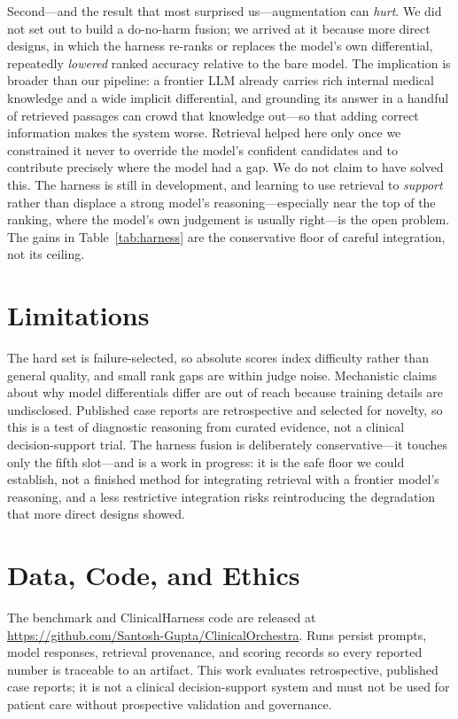 \documentclass{article}
\begin{document}
Second---and the result that most surprised us---augmentation can \emph{hurt}. We did not set out to build a
do-no-harm fusion; we arrived at it because more direct designs, in which the harness re-ranks or replaces
the model's own differential, repeatedly \emph{lowered} ranked accuracy relative to the bare model. The
implication is broader than our pipeline: a frontier LLM already carries rich internal medical knowledge and
a wide implicit differential, and grounding its answer in a handful of retrieved passages can crowd that
knowledge out---so that adding correct information makes the system worse. Retrieval helped here only once we
constrained it never to override the model's confident candidates and to contribute precisely where the model
had a gap. We do not claim to have solved this. The harness is still in development, and learning to use
retrieval to \emph{support} rather than displace a strong model's reasoning---especially near the top of the
ranking, where the model's own judgement is usually right---is the open problem. The gains in
Table~\ref{tab:harness} are the conservative floor of careful integration, not its ceiling.

\section{Limitations}

The hard set is failure-selected, so absolute scores index difficulty rather than general quality, and small
rank gaps are within judge noise. Mechanistic claims about why model differentials differ are out of
reach because training details are undisclosed. Published case reports are retrospective and selected for
novelty, so this is a test of diagnostic reasoning from curated evidence, not a clinical decision-support
trial. The harness fusion is deliberately conservative---it touches only the fifth slot---and is a work in progress:
it is the safe floor we could establish, not a finished method for integrating retrieval with a frontier
model's reasoning, and a less restrictive integration risks reintroducing the degradation that more direct
designs showed.

\section{Data, Code, and Ethics}\label{sec:data}

The benchmark and ClinicalHarness code are released at
\url{https://github.com/Santosh-Gupta/ClinicalOrchestra}. Runs persist prompts, model
responses, retrieval provenance, and scoring records so every reported number is traceable to an artifact.
This work evaluates retrospective, published case reports; it is not a clinical decision-support system and
must not be used for patient care without prospective validation and governance.
\end{document}
